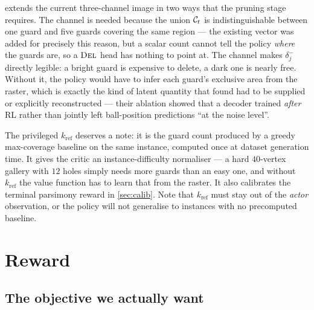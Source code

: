 \documentclass[11pt,a4paper]{article}
\begin{document}
 extends the current three-channel image in two ways that the pruning stage
requires. The  channel is needed because the union $\mathcal{C}_t$ is
indistinguishable between one guard and five guards covering the same region --- the
existing  vector was added for precisely this reason, but a scalar count
cannot tell the policy \emph{where} the guards are, so a $\textsc{Del}$ head has nothing to point
at. The  channel makes $\delta^-_j$ directly legible: a bright guard is
expensive to delete, a dark one is nearly free. Without it, the policy would have to infer
each guard's exclusive area from the raster, which is exactly the kind of latent quantity
that \citet{wang2025vision} found had to be supplied or explicitly reconstructed --- their
ablation showed that a decoder trained \emph{after} RL rather than jointly left ball-position
predictions ``at the noise level''.


The privileged $k_{\mathrm{ref}}$ deserves a note: it is the guard count produced by a
greedy max-coverage baseline on the same instance, computed once at dataset generation
time. It gives the critic an instance-difficulty normaliser --- a hard $40$-vertex gallery
with $12$ holes simply needs more guards than an easy one, and without $k_{\mathrm{ref}}$ the
value function has to learn that from the raster. It also calibrates the terminal
parsimony reward in \cref{sec:calib}. Note that $k_{\mathrm{ref}}$ must stay out of the
\emph{actor} observation, or the policy will not generalise to instances with no
precomputed baseline.

\section{Reward}\label{sec:reward}

\subsection{The objective we actually want}
\end{document}
